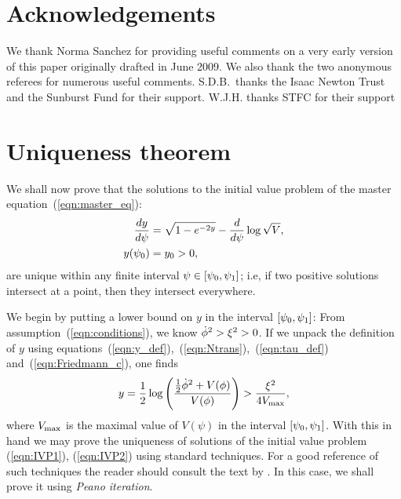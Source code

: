 \section*{Acknowledgements}
We thank Norma Sanchez for providing useful comments on a very early version of this paper originally drafted in June 2009. We also thank the two anonymous referees for numerous useful comments. S.D.B.\ thanks the Isaac Newton Trust and the Sunburst Fund for their support. W.J.H.  thanks STFC for their support




\section{Uniqueness theorem}
\label{sec:uniqueness_theorem}
We shall now prove that the solutions to the initial value problem of the master equation~(\ref{eqn:master_eq}):
%
\begin{align}
  \frac{dy}{d\psi}
  &=
  \sqrt{1-e^{-2y}} - \frac{d}{d\psi}\log \sqrt V,
  \label{eqn:IVP1}
  \\
  y(\psi_0)
  &=
  y_0>0
  \label{eqn:IVP2},
\end{align}
%
are unique within any finite interval $\psi\in[\psi_0,\psi_1]$; i.e, if two positive solutions intersect at a point, then they intersect
everywhere.

We begin by putting a lower bound on $y$ in the interval $[\psi_0,\psi_1]$: From assumption~(\ref{eqn:conditions}), we know $\dot{\phi}^2>\xi^2>0$. If we unpack the definition of $y$ using equations~(\ref{eqn:y_def}),~(\ref{eqn:Ntrans}),~(\ref{eqn:tau_def}) and~(\ref{eqn:Friedmann_c}), one finds
%
\begin{equation}
  y 
  = 
  \frac{1}{2}\log
  \left(\frac{\frac{1}{2}\dot{\phi}^2 + V(\phi)}{V(\phi)}\right) 
  > 
  \frac{\xi^2}{4V_\mathrm{max}},
\end{equation}
%
where $V_\mathrm{max}$ is the maximal value of $V(\psi)$ in the interval $[\psi_0,\psi_1]$. With this in hand we may prove the uniqueness of solutions of the initial value problem (\ref{eqn:IVP1}), (\ref{eqn:IVP2}) using standard techniques. For a good reference of such techniques the reader should consult the text by \citet{agarwal_1993}. In this case, we shall prove it using {\em Peano iteration}.


